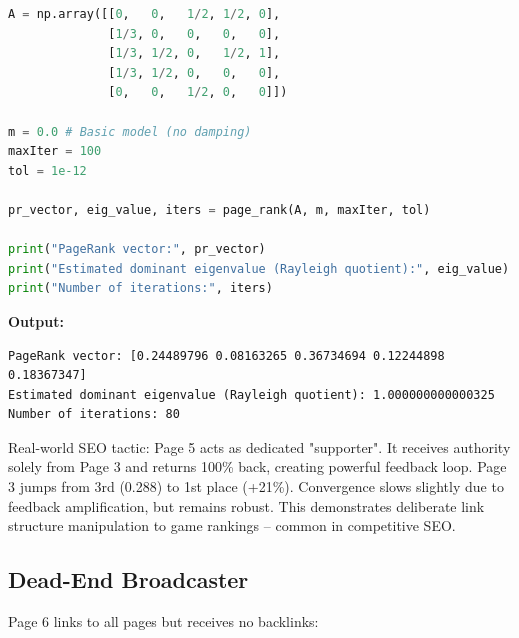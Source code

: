 \documentclass[11pt]{article}
\begin{document}
\begin{lstlisting}[language=Python]
A = np.array([[0,   0,   1/2, 1/2, 0],
              [1/3, 0,   0,   0,   0],
              [1/3, 1/2, 0,   1/2, 1],
              [1/3, 1/2, 0,   0,   0],
              [0,   0,   1/2, 0,   0]])

m = 0.0 # Basic model (no damping)
maxIter = 100
tol = 1e-12

pr_vector, eig_value, iters = page_rank(A, m, maxIter, tol)

print("PageRank vector:", pr_vector)
print("Estimated dominant eigenvalue (Rayleigh quotient):", eig_value)
print("Number of iterations:", iters)
\end{lstlisting}

\noindent\textbf{Output:}
\begin{lstlisting}
PageRank vector: [0.24489796 0.08163265 0.36734694 0.12244898 0.18367347]
Estimated dominant eigenvalue (Rayleigh quotient): 1.000000000000325
Number of iterations: 80
\end{lstlisting}



\noindent Real-world SEO tactic: Page 5 acts as dedicated "supporter". It receives authority solely from Page 3 and returns 100\% back, creating powerful feedback loop. Page 3 jumps from 3rd (0.288) to 1st place (+21\%). Convergence slows slightly due to feedback amplification, but remains robust. This demonstrates deliberate link structure manipulation to game rankings -- common in competitive SEO.

\subsection{Dead-End Broadcaster}

Page 6 links to all pages but receives no backlinks:
\end{document}
